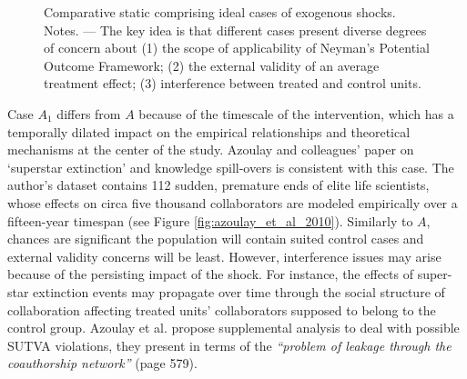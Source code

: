 \documentclass[11pt]{article}
\begin{document}
\begin{refsection}
\begin{figure}[!htbp]
\begin{center}
    \end{center}
  \caption{Comparative static comprising ideal cases of exogenous shocks. 
  Notes. --- The key idea is that different cases present diverse 
  degrees of concern about (1) the scope of applicability of Neyman's
  Potential Outcome Framework; (2) the external validity of an average
  treatment effect; (3) interference between treated and control
  units.}
  \label{fig:comparative_static}
\end{figure}

\vspace{2em}

Case $A_{1}$ differs from $A$ because of the timescale of the intervention,
which has a temporally dilated impact on the empirical relationships and 
theoretical mechanisms at the center of the study. Azoulay and colleagues'
\autocite*{azoulay_et_al_2010} paper on `superstar extinction' and knowledge
spill-overs is consistent with this case. The author's dataset contains 112
sudden, premature ends of elite life scientists, whose effects on circa five
thousand collaborators are modeled empirically over a fifteen-year timespan
(see Figure \ref{fig:azoulay_et_al_2010}). Similarly to $A$, chances are
significant the population will contain suited control cases and external
validity concerns will be least. However, interference issues may arise because
of the persisting impact of the shock.  For instance, the effects of super-star
extinction events may propagate over time through the social structure of
collaboration affecting treated units' collaborators supposed
to belong to the control group. Azoulay et al.  \autocite*{azoulay_et_al_2010}
propose supplemental analysis to deal with possible SUTVA violations, they
present in terms of the \textit{``problem of leakage through the coauthorship
network''} (page 579).


\end{refsection}
\end{document}
